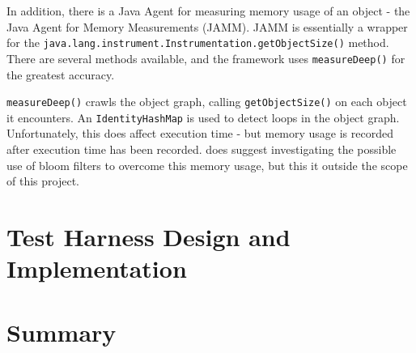 	In addition, there is a Java Agent for measuring memory usage of an object - the Java Agent for Memory Measurements \citep{JAMM} (JAMM). JAMM is essentially a wrapper for the \texttt{java.lang.instrument.Instrumentation.getObjectSize()} method. There are several methods available, and the framework uses \texttt{measureDeep()} for the greatest accuracy.
	
	\texttt{measureDeep()} crawls the object graph, calling \texttt{getObjectSize()} on each object it encounters. An \texttt{IdentityHashMap} is used to detect loops in the object graph. Unfortunately, this does affect execution time - but memory usage is recorded after execution time has been recorded. \citeauthor{JAMM} does suggest investigating the possible use of bloom filters to overcome this memory usage, but this it outside the scope of this project.
	
\section{Test Harness Design and Implementation} \label{sec:methodology/implementation}
	
\section{Summary} \label{sec:methodology/summary}